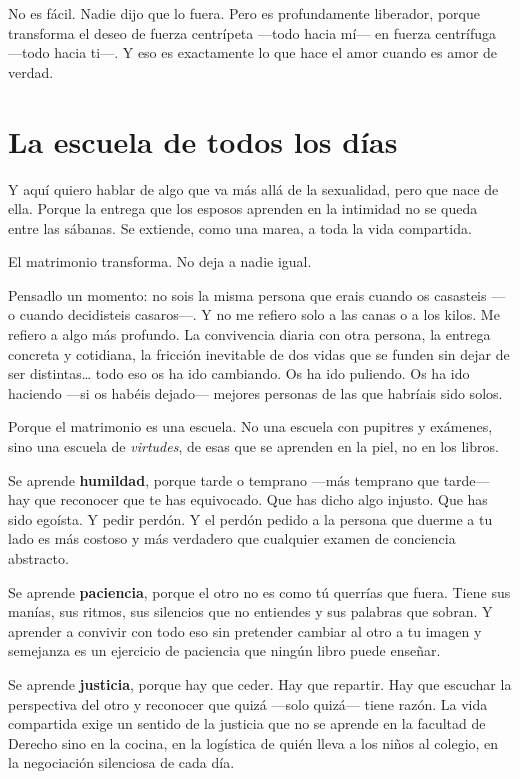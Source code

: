 No es fácil. Nadie dijo que lo fuera. Pero es profundamente liberador, porque transforma el deseo de fuerza centrípeta ---todo hacia mí--- en fuerza centrífuga ---todo hacia ti---. Y eso es exactamente lo que hace el amor cuando es amor de verdad.

\section{La escuela de todos los días}

Y aquí quiero hablar de algo que va más allá de la sexualidad, pero que nace de ella. Porque la entrega que los esposos aprenden en la intimidad no se queda entre las sábanas. Se extiende, como una marea, a toda la vida compartida.

El matrimonio transforma. No deja a nadie igual.

Pensadlo un momento: no sois la misma persona que erais cuando os casasteis ---o cuando decidisteis casaros---. Y no me refiero solo a las canas o a los kilos. Me refiero a algo más profundo. La convivencia diaria con otra persona, la entrega concreta y cotidiana, la fricción inevitable de dos vidas que se funden sin dejar de ser distintas\ldots{} todo eso os ha ido cambiando. Os ha ido puliendo. Os ha ido haciendo ---si os habéis dejado--- mejores personas de las que habríais sido solos.

Porque el matrimonio es una escuela. No una escuela con pupitres y exámenes, sino una escuela de \emph{virtudes}, de esas que se aprenden en la piel, no en los libros.

Se aprende \textbf{humildad}, porque tarde o temprano ---más temprano que tarde--- hay que reconocer que te has equivocado. Que has dicho algo injusto. Que has sido egoísta. Y pedir perdón. Y el perdón pedido a la persona que duerme a tu lado es más costoso y más verdadero que cualquier examen de conciencia abstracto.

Se aprende \textbf{paciencia}, porque el otro no es como tú querrías que fuera. Tiene sus manías, sus ritmos, sus silencios que no entiendes y sus palabras que sobran. Y aprender a convivir con todo eso sin pretender cambiar al otro a tu imagen y semejanza es un ejercicio de paciencia que ningún libro puede enseñar.

Se aprende \textbf{justicia}, porque hay que ceder. Hay que repartir. Hay que escuchar la perspectiva del otro y reconocer que quizá ---solo quizá--- tiene razón. La vida compartida exige un sentido de la justicia que no se aprende en la facultad de Derecho sino en la cocina, en la logística de quién lleva a los niños al colegio, en la negociación silenciosa de cada día.

